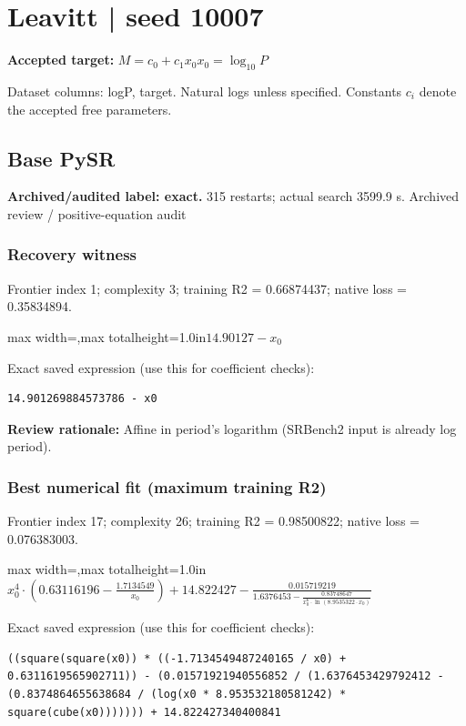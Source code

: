 \documentclass[10pt,letterpaper,landscape]{article}
\begin{document}
\section*{Leavitt | seed 10007}
\textbf{Accepted target:} $\displaystyle M=c_0+c_1x_0$\hfill $x_0=\log_{10}P$\par
{\small Dataset columns: logP, target. Natural logs unless specified. Constants $c_i$ denote the accepted free parameters.}\par\medskip
\begin{minipage}[t]{0.485\textwidth}
\subsection*{Base PySR}
\textbf{Archived/audited label: exact.} 315 restarts; actual search 3599.9 s.
{\small Archived review / positive-equation audit}
\subsubsection*{Recovery witness}
Frontier index 1; complexity 3; training R2 = 0.66874437; native loss = 0.35834894.
\begin{center}\begin{adjustbox}{max width=\linewidth,max totalheight=1.0in}$\displaystyle 14.90127 - x_{0}$\end{adjustbox}\end{center}
{\scriptsize Exact saved expression (use this for coefficient checks):}
\begin{lstlisting}
14.901269884573786 - x0
\end{lstlisting}
{\small\textbf{Review rationale:} Affine in period's logarithm (SRBench2 input is already log period).}
\subsubsection*{Best numerical fit (maximum training R2)}
Frontier index 17; complexity 26; training R2 = 0.98500822; native loss = 0.076383003.
\begin{center}\begin{adjustbox}{max width=\linewidth,max totalheight=1.0in}$\displaystyle x_{0}^{4} \cdot \left(0.63116196 - \frac{1.7134549}{x_{0}}\right) + 14.822427 - \frac{0.015719219}{1.6376453 - \frac{0.83748647}{x_{0}^{6} \cdot \ln{\left(8.9535322 \cdot x_{0} \right)}}}$\end{adjustbox}\end{center}
{\scriptsize Exact saved expression (use this for coefficient checks):}
\begin{lstlisting}
((square(square(x0)) * ((-1.7134549487240165 / x0) + 0.6311619565902711)) - (0.01571921940556852 / (1.6376453429792412 - (0.8374864655638684 / (log(x0 * 8.953532180581242) * square(cube(x0))))))) + 14.822427340400841
\end{lstlisting}
\end{minipage}\hfill
\end{document}
